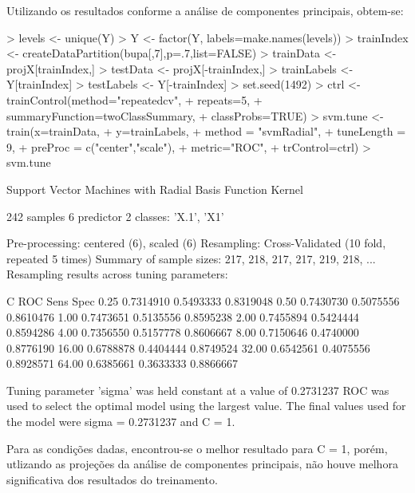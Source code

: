 \documentclass{article}
\begin{document}
Utilizando os resultados conforme a análise de componentes principais, obtem-se:
\begin{Schunk}
\begin{Sinput}
> levels <- unique(Y) 
> Y <- factor(Y, labels=make.names(levels))
> trainIndex <- createDataPartition(bupa[,7],p=.7,list=FALSE)
> trainData <- projX[trainIndex,]
> testData  <- projX[-trainIndex,]
> trainLabels <- Y[trainIndex]
> testLabels <- Y[-trainIndex]
> set.seed(1492)
> ctrl <- trainControl(method="repeatedcv",
+                      repeats=5,
+                      summaryFunction=twoClassSummary,
+                      classProbs=TRUE)
> svm.tune <- train(x=trainData,
+                   y=trainLabels,
+                   method = "svmRadial",
+                   tuneLength = 9,
+                   preProc = c("center","scale"),
+                   metric="ROC",
+                   trControl=ctrl)
> svm.tune
\end{Sinput}
\begin{Soutput}
Support Vector Machines with Radial Basis Function Kernel 

242 samples
  6 predictor
  2 classes: 'X.1', 'X1' 

Pre-processing: centered (6), scaled (6) 
Resampling: Cross-Validated (10 fold, repeated 5 times) 
Summary of sample sizes: 217, 218, 217, 217, 219, 218, ... 
Resampling results across tuning parameters:

  C      ROC        Sens       Spec     
   0.25  0.7314910  0.5493333  0.8319048
   0.50  0.7430730  0.5075556  0.8610476
   1.00  0.7473651  0.5135556  0.8595238
   2.00  0.7455894  0.5424444  0.8594286
   4.00  0.7356550  0.5157778  0.8606667
   8.00  0.7150646  0.4740000  0.8776190
  16.00  0.6788878  0.4404444  0.8749524
  32.00  0.6542561  0.4075556  0.8928571
  64.00  0.6385661  0.3633333  0.8866667

Tuning parameter 'sigma' was held constant at a value of 0.2731237
ROC was used to select the optimal model using  the largest value.
The final values used for the model were sigma = 0.2731237 and C = 1.
\end{Soutput}
\end{Schunk}
Para as condições dadas, encontrou-se o melhor resultado para C = 1, porém, utlizando as projeções da análise de componentes principais, não houve melhora significativa dos resultados do treinamento.
\end{document}
